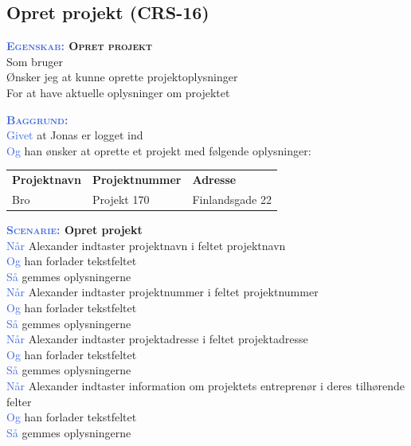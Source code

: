 \subsection{Opret projekt (CRS-16)} \label{sec:USOpretProjekt}
\textbf{\textsc{\textcolor{RoyalBlue}{Egenskab:} Opret projekt}}\\
Som bruger\\
Ønsker jeg at kunne oprette projektoplysninger\\
For at have aktuelle oplysninger om projektet

\textsc{\textcolor{RoyalBlue}{\textbf{Baggrund:}}}\\
\textcolor{RoyalBlue}{Givet} at Jonas er logget ind\\
\textcolor{RoyalBlue}{Og} han ønsker at oprette et projekt med følgende oplysninger:\\
\begin{tabular}{| l | l | l |}
	\textbf{Projektnavn} & \textbf{Projektnummer} & \textbf{Adresse} \\
	Bro & Projekt 170 & Finlandsgade 22 \\
\end{tabular}
\newline \newline

\textbf{\textsc{\textcolor{RoyalBlue}{Scenarie:}} Opret projekt}\\
\textcolor{RoyalBlue}{Når} Alexander indtaster projektnavn i feltet projektnavn\\
\textcolor{RoyalBlue}{Og} han forlader tekstfeltet\\
\textcolor{RoyalBlue}{Så} gemmes oplysningerne\\
\textcolor{RoyalBlue}{Når} Alexander indtaster projektnummer i feltet projektnummer\\
\textcolor{RoyalBlue}{Og} han forlader tekstfeltet\\
\textcolor{RoyalBlue}{Så} gemmes oplysningerne\\
\textcolor{RoyalBlue}{Når} Alexander indtaster projektadresse i feltet projektadresse\\
\textcolor{RoyalBlue}{Og} han forlader tekstfeltet\\
\textcolor{RoyalBlue}{Så} gemmes oplysningerne\\
\textcolor{RoyalBlue}{Når} Alexander indtaster information om projektets entreprenør i deres tilhørende felter\\
\textcolor{RoyalBlue}{Og} han forlader tekstfeltet\\
\textcolor{RoyalBlue}{Så} gemmes oplysningerne\\

